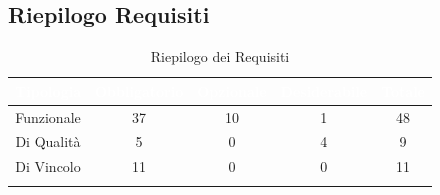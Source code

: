 \subsection{Riepilogo Requisiti}\label{Riepilogo}
\begin{center}
\begin{longtable}[c]{|c|c|c|c|c|}
\hline
\rowcolor{bluelogo}\textbf{\textcolor{white}{Tipologia}} & \textbf{\textcolor{white}{Obbligatorio}} & \textbf{\textcolor{white}{Opzionale}} & \textbf{\textcolor{white}{Desiderabile}} & \textbf{\textcolor{white}{Totale}}\\
\hline \hline
\endhead
Funzionale & 37 & 10 & 1 & 48\\
\hline
\rowcolor{grigio}Di Qualità & 5 & 0 & 4 & 9\\
\hline
Di Vincolo & 11 & 0 & 0 & 11\\
\hline
\caption{Riepilogo dei Requisiti}
\end{longtable}
\end{center}